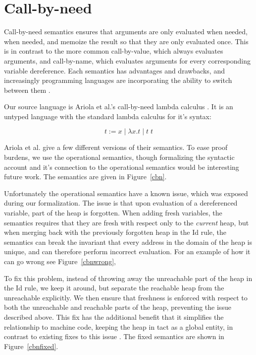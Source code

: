 \section{Call-by-need}

Call-by-need semantics ensures that arguments are only evaluated when needed,
when needed, and memoize the result so that they are only evaluated once. This
is in contrast to the more common call-by-value, which always evaluates
arguments, and call-by-name, which evaluates arguments for every corresponding
variable dereference. Each semantics has advantages and drawbacks, and
increasingly programming languages are incorporating the ability to switch
between them \cite{?}. 

Our source language is Ariola et al.'s call-by-need lambda calculus \cite{?}. It
is an untyped language with the standard lambda calculus for it's syntax: 

  $$ t := x \; | \; \lambda x . t \; | \; t \; t $$

Ariola et al. give a few different versions of their semantics. To ease 
proof burdens, we use the operational semantics, though formalizing the
syntactic account and it's connection to the operational semantics would be
interesting future work. The semantics are given in Figure~\ref{cbn}. 

Unfortunately the operational semantics have a known issue, which was exposed
during our formalization. The issue is that upon evaluation of a dereferenced
variable, part of the heap is forgotten. When adding fresh variables, the
semantics requires that they are fresh with respect only to the \emph{current}
heap, but when merging back with the previously forgotten heap in the Id rule,
the semantics can break the invariant that every address in the domain of the
heap is unique, and can therefore perform incorrect evaluation. For an example
of how it can go wrong see Figure~\ref{cbnwrong}, 

To fix this problem, instead of throwing away the unreachable part of the heap
in the Id rule, we keep it around, but separate the reachable heap from the
unreachable explicitly. We then ensure that freshness is enforced with respect
to both the unreachable and reachable parts of the heap, preventing the issue
described above. This fix has the additional benefit that it simplifies the
relationship to machine code, keeping the heap in tact as a global entity, in
contrast to existing fixes to this issue \cite{?}. The fixed semantics are shown
in Figure~\ref{cbnfixed}.

